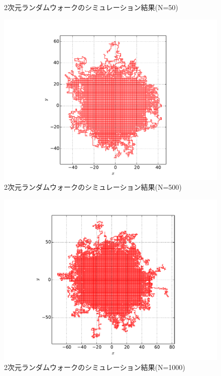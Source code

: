 \documentclass{jsarticle}
\begin{document}
\begin{enumerate}
\begin{enumerate}
\begin{figure}[H]
\begin{center}
                            \caption{2次元ランダムウォークのシミュレーション結果(N=50)}
                            \label{fig:f1}
                        \end{center}
                    \end{figure}
                    \begin{figure}[H]
                        \begin{center}
                            \includegraphics[width=12.5cm]{figure_1.pdf}
                            \caption{2次元ランダムウォークのシミュレーション結果(N=500)}
                            \label{fig:f2}
                        \end{center}
                    \end{figure}
                    \begin{figure}[H]
                        \begin{center}
                            \includegraphics[width=12.5cm]{figure_4.pdf}
                            \caption{2次元ランダムウォークのシミュレーション結果(N=1000)}
                            \label{fig:f3}
                        \end{center}
                    \end{figure}


\end{enumerate}
\end{enumerate}
\end{document}

